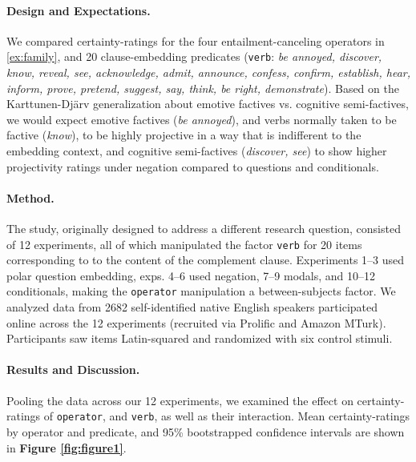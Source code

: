 \documentclass[12pt, a4paper]{scrartcl}
\begin{document}

\vspace{-\baselineskip}
\paragraph{Design and Expectations.} \hspace{-1em}
	We compared certainty-ratings for the four entailment-canceling operators in \ref{ex:family}, and 20 clause-embedding predicates (\texttt{verb}: {\em be annoyed, discover, know, reveal, see, acknowledge, admit, announce, confess, confirm, establish, hear, inform, prove, pretend, suggest, say, think, be right, demonstrate}).
	Based on the Karttunen-Djärv generalization about emotive factives vs. cognitive semi-factives, we would expect emotive factives (\emph{be annoyed}), and verbs normally taken to be factive (\emph{know}), to be highly projective in a way that is indifferent to the embedding context, and cognitive semi-factives (\emph{discover, see}) to show higher projectivity ratings under negation compared to questions and conditionals.


\vspace{-\baselineskip}
\paragraph{Method.} \hspace{-1em}
	The study, originally designed to address a different research question, consisted of 12 experiments, all of which manipulated the factor \texttt{verb} for 20 items corresponding to to the content of the complement clause. Experiments 1--3 used polar question embedding, exps. 4--6 used negation, 7--9 modals, and 10--12 conditionals, making the \texttt{operator} manipulation a between-subjects factor. We analyzed data from 2682 self-identified native English speakers participated online across the 12 experiments (recruited via Prolific and Amazon MTurk). Participants saw items Latin-squared and randomized with six control stimuli.


\vspace{-\baselineskip}
\paragraph{Results and Discussion.} \hspace{-1em}
	Pooling the data across our 12 experiments, we examined the effect on certainty-ratings of \texttt{operator}, and \texttt{verb}, as well as their interaction. Mean certainty-ratings by operator and predicate, and 95\% bootstrapped confidence intervals are shown in  \textbf{Figure \ref{fig:figure1}}.
\end{document}
